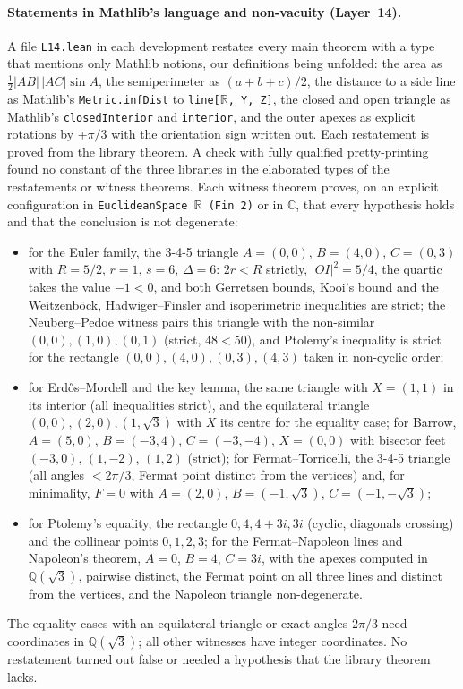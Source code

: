 \documentclass[11pt]{article}
\theoremstyle{definition}
\theoremstyle{remark}
\newcommand{\lean}[1]{\texttt{#1}}
\begin{document}
\paragraph{Statements in Mathlib's language and non-vacuity (Layer~14).} A file \lean{L14.lean} in
each development restates every main theorem with a type that mentions only Mathlib notions, our
definitions being unfolded: the area as $\tfrac12|AB|\,|AC|\sin A$, the semiperimeter as
$(a+b+c)/2$, the distance to a side line as Mathlib's \lean{Metric.infDist} to
\lean{line[\(\mathbb{R}\), Y, Z]}, the closed and open triangle as Mathlib's \lean{closedInterior} and
\lean{interior}, and the outer apexes as explicit rotations by $\mp\pi/3$ with the orientation sign
written out. Each restatement is proved from the library theorem. A check with fully qualified
pretty-printing found no constant of the three libraries in the elaborated types of the restatements
or witness theorems. Each witness theorem proves, on an explicit configuration in
\lean{EuclideanSpace \(\mathbb{R}\) (Fin 2)} or in $\mathbb{C}$, that every hypothesis holds and that the
conclusion is not degenerate:
\begin{itemize}
\item for the Euler family, the 3-4-5 triangle $A=(0,0)$, $B=(4,0)$, $C=(0,3)$ with $R=5/2$, $r=1$,
$s=6$, $\Delta=6$: $2r<R$ strictly, $|OI|^2=5/4$, the quartic takes the value $-1<0$, and both
Gerretsen bounds, Kooi's bound and the Weitzenb\"ock, Hadwiger--Finsler and isoperimetric
inequalities are strict; the Neuberg--Pedoe witness pairs this triangle with the non-similar
$(0,0),(1,0),(0,1)$ (strict, $48<50$), and Ptolemy's inequality is strict for the rectangle
$(0,0),(4,0),(0,3),(4,3)$ taken in non-cyclic order;
\item for Erdős--Mordell and the key lemma, the same triangle with $X=(1,1)$ in its interior (all
inequalities strict), and the equilateral triangle $(0,0),(2,0),(1,\sqrt3)$ with $X$ its centre for
the equality case; for Barrow, $A=(5,0)$, $B=(-3,4)$, $C=(-3,-4)$, $X=(0,0)$ with bisector feet
$(-3,0)$, $(1,-2)$, $(1,2)$ (strict); for Fermat--Torricelli, the 3-4-5 triangle (all angles
$<2\pi/3$, Fermat point distinct from the vertices) and, for minimality, $F=0$ with $A=(2,0)$,
$B=(-1,\sqrt3)$, $C=(-1,-\sqrt3)$;
\item for Ptolemy's equality, the rectangle $0,4,4+3i,3i$ (cyclic, diagonals crossing) and the
collinear points $0,1,2,3$; for the Fermat--Napoleon lines and Napoleon's theorem, $A=0$, $B=4$,
$C=3i$, with the apexes computed in $\mathbb{Q}(\sqrt3)$, pairwise distinct, the Fermat point on all
three lines and distinct from the vertices, and the Napoleon triangle non-degenerate.
\end{itemize}
The equality cases with an equilateral triangle or exact angles $2\pi/3$ need coordinates in
$\mathbb{Q}(\sqrt3)$; all other witnesses have integer coordinates. No restatement turned out false or
needed a hypothesis that the library theorem lacks.
\end{document}

